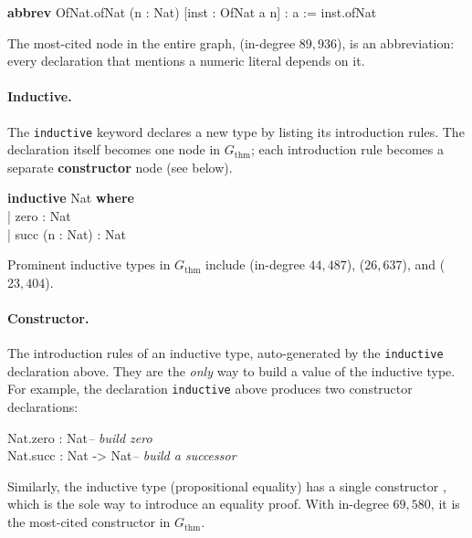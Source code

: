\begin{codebox}
\textbf{abbrev} \textcolor{red!70!black}{OfNat.ofNat} (n : Nat) [inst : OfNat a n] : a := inst.ofNat
\end{codebox}

\noindent
The most-cited node in the entire graph,  (in-degree $89{,}936$), is an abbreviation: every declaration that mentions a numeric literal depends on it.

\paragraph{Inductive.}
The \texttt{inductive} keyword declares a new type by listing its introduction rules. The declaration itself becomes one node in $G_{\mathrm{thm}}$; each introduction rule becomes a separate \textbf{constructor} node (see below).

\begin{codebox}
\textbf{inductive} \textcolor{red!70!black}{Nat} \textbf{where}\\
\hspace{1.5em}| \textcolor{red!70!black}{zero} : Nat\\
\hspace{1.5em}| \textcolor{red!70!black}{succ} (n : Nat) : Nat
\end{codebox}

\noindent
Prominent inductive types in $G_{\mathrm{thm}}$ include  (in-degree $44{,}487$),  ($26{,}637$), and  ($23{,}404$).

\paragraph{Constructor.}
The introduction rules of an inductive type, auto-generated by the \texttt{inductive} declaration above. They are the \emph{only} way to build a value of the inductive type. For example, the declaration \texttt{inductive}  above produces two constructor declarations:

\begin{codebox}
\textcolor{red!70!black}{Nat.zero} : Nat\hfill\textit{\color{gray}-- build zero}\\
\textcolor{red!70!black}{Nat.succ} : Nat -> Nat\hfill\textit{\color{gray}-- build a successor}
\end{codebox}

\noindent
Similarly, the inductive type  (propositional equality) has a single constructor , which is the sole way to introduce an equality proof. With in-degree $69{,}580$, it is the most-cited constructor in $G_{\mathrm{thm}}$.

